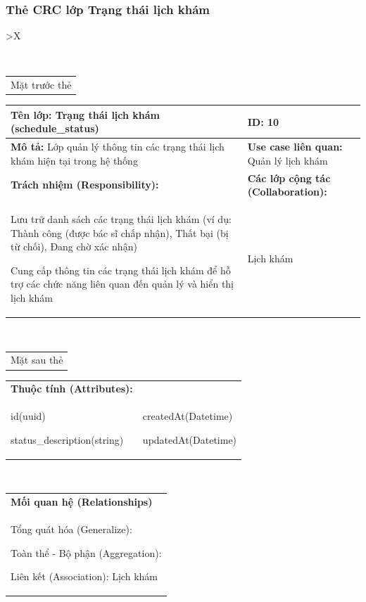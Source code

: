 \subsubsection{Thẻ CRC lớp Trạng thái lịch khám}

\begin{xltabular}{\textwidth}{
		>{\centering\arraybackslash}X
	}
	\caption{\bfseries \fontsize{12pt}{0pt}\selectfont Thẻ CRC lớp Trạng thái lịch khám}
	\\
	\begin{tabularx}{0.9\textwidth}{X}
		Mặt trước thẻ
	\end{tabularx}
	\begin{tabularx}{0.9\textwidth}{|X|X|}
		\hline
		\textbf{Tên lớp:} Trạng thái lịch khám (schedule\_status)                              & \textbf{ID:} 10                                 \\
		\hline
		\textbf{Mô tả:} Lớp quản lý thông tin các trạng thái lịch khám hiện tại trong hệ thống & \textbf{Use case liên quan:}  Quản lý lịch khám \\
		\hline
		\textbf{Trách nhiệm (Responsibility):}                                                 & \textbf{Các lớp cộng tác (Collaboration):}      \\
		Lưu trữ danh sách các trạng thái lịch khám (ví dụ: Thành công (được bác sĩ chấp nhận), Thất bại (bị từ chối), Đang chờ xác nhận)

		Cung cấp thông tin các trạng thái lịch khám để hỗ trợ các chức năng liên quan đến quản lý và hiển thị lịch khám
		                                                                                       &
		Lịch khám
		\\
		\hline
	\end{tabularx}
	\\
	\begin{tabularx}{0.9\textwidth}{X}
		Mặt sau thẻ
	\end{tabularx}
	\begin{tabularx}{0.9\textwidth}{|X|X|}
		\hline
		\textbf{Thuộc tính (Attributes):} & \\
		id(uuid)

		status\_description(string)
		                                  &
		createdAt(Datetime)

		updatedAt(Datetime)
		\\ \hline
	\end{tabularx}
	\\
	\begin{tabularx}{0.9\textwidth}{|X|}
		\hline
		\textbf{Mối quan hệ (Relationships)} \\
		Tổng quát hóa (Generalize):

		Toàn thể - Bộ phận (Aggregation):

		Liên kết (Association): Lịch khám
		\\
		\hline
	\end{tabularx}
\end{xltabular}

